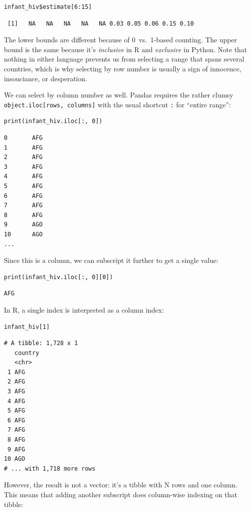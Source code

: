 \begin{lstlisting}
infant_hiv$estimate[6:15]
\end{lstlisting}

\begin{lstlisting}
 [1]   NA   NA   NA   NA   NA 0.03 0.05 0.06 0.15 0.10
\end{lstlisting}

The lower bounds are different because of 0~vs.~1-based counting.
The upper bound is the same because it's \emph{inclusive} in R and \emph{exclusive} in Python.
Note that nothing in either language prevents us from selecting a range that spans several countries,
which is why selecting by row number is usually a sign of innocence, insouciance, or desperation.

We can select by column number as well.
Pandas requires the rather clumsy \texttt{object.iloc[rows, columns]}
with the usual shortcut \texttt{:} for ``entire range'':

\begin{lstlisting}
print(infant_hiv.iloc[:, 0])
\end{lstlisting}

\begin{lstlisting}
0       AFG
1       AFG
2       AFG
3       AFG
4       AFG
5       AFG
6       AFG
7       AFG
8       AFG
9       AGO
10      AGO
...
\end{lstlisting}

\noindent
Since this is a column,
we can subscript it further to get a single value:

\begin{lstlisting}
print(infant_hiv.iloc[:, 0][0])
\end{lstlisting}

\begin{lstlisting}
AFG
\end{lstlisting}

In R,
a single index is interpreted as a column index:

\begin{lstlisting}
infant_hiv[1]
\end{lstlisting}

\begin{lstlisting}
# A tibble: 1,728 x 1
   country
   <chr>  
 1 AFG    
 2 AFG    
 3 AFG    
 4 AFG    
 5 AFG    
 6 AFG    
 7 AFG    
 8 AFG    
 9 AFG    
10 AGO    
# ... with 1,718 more rows
\end{lstlisting}

However,
the result is not a vector:
it's a tibble with N rows and one column.
This means that adding another subscript does column-wise indexing on that tibble:

